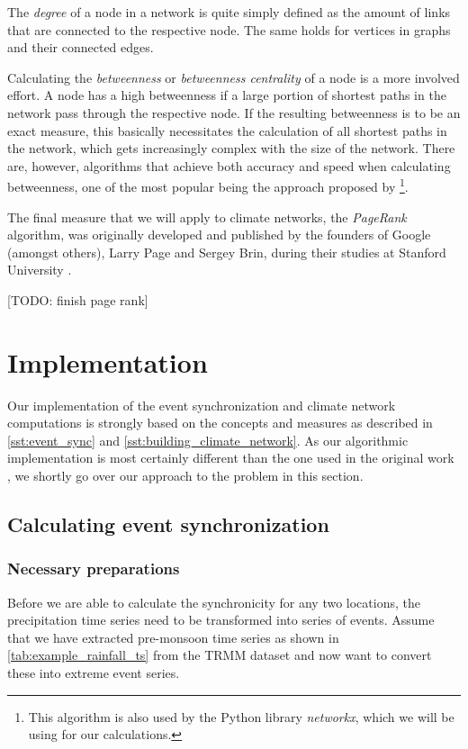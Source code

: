 The \textit{degree} of a node in a network is quite simply defined as the amount of links that are connected to the respective node. The same holds for vertices in graphs and their connected edges.

Calculating the \textit{betweenness} or \textit{betweenness centrality} of a node is a more involved effort. A node has a high betweenness if a large portion of shortest paths in the network pass through the respective node. If the resulting betweenness is to be an exact measure, this basically necessitates the calculation of all shortest paths in the network, which gets increasingly complex with the size of the network. There are, however, algorithms that achieve both accuracy and speed when calculating betweenness, one of the most popular being the approach proposed by \citet{Brandes.2001}\footnote{This algorithm is also used by the Python library \textit{networkx}, which we will be using for our calculations.}.

The final measure that we will apply to climate networks, the \textit{PageRank} algorithm, was originally developed and published by the founders of Google (amongst others), Larry Page and Sergey Brin, during their studies at Stanford University \citep{Page.1999}.

[TODO: finish page rank]

\section{Implementation}
\label{st:event_sync_implementation}
Our implementation of the event synchronization and climate network computations is strongly based on the concepts and measures as described in \cref{sst:event_sync} and \cref{sst:building_climate_network}. As our algorithmic implementation is most certainly different than the one used in the original work \citep{Stolbova.2015}, we shortly go over our approach to the problem in this section.

\subsection{Calculating event synchronization}
\label{sst:event_sync_calculation}

\subsubsection{Necessary preparations}
Before we are able to calculate the synchronicity for any two locations, the precipitation time series need to be transformed into series of events. Assume that we have extracted pre-monsoon time series as shown in \cref{tab:example_rainfall_ts} from the TRMM dataset and now want to convert these into extreme event series.

